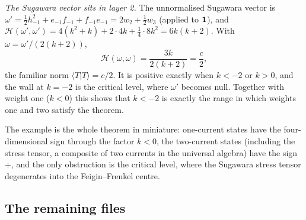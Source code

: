 \begin{example}
\emph{The Sugawara vector sits in layer 2.} The unnormalised Sugawara vector is
$\omega' = \tfrac12h_{-1}^2+e_{-1}f_{-1}+f_{-1}e_{-1} = 2w_2+\tfrac12w_3$ (applied to $\mathbf{1}$), and
$\mathcal H(\omega',\omega') = 4(k^2+k)+2\cdot4k+\tfrac14\cdot8k^2 = 6k(k+2)$. With $\omega = \omega'/(2(k+2))$,
\begin{equation*}
  \mathcal H(\omega,\omega) = \frac{3k}{2(k+2)} = \frac c2,
\end{equation*}
the familiar norm $\langle T|T\rangle = c/2$. It is positive exactly when $k<-2$ or $k>0$, and the wall at $k = -2$ is
the critical level, where $\omega'$ becomes null. Together with weight one ($k<0$) this shows that $k<-2$ is exactly the
range in which weights one and two satisfy the theorem.
\end{example}

\begin{physics}
The example is the whole theorem in miniature: one-current states have the four-dimensional sign through the
factor $k<0$, the two-current states (including the stress tensor, a composite of two currents in the universal
algebra) have the sign $+$, and the only obstruction is the critical level, where the Sugawara stress tensor
degenerates into the Feigin--Frenkel centre.
\end{physics}

\subsection{The remaining files}

